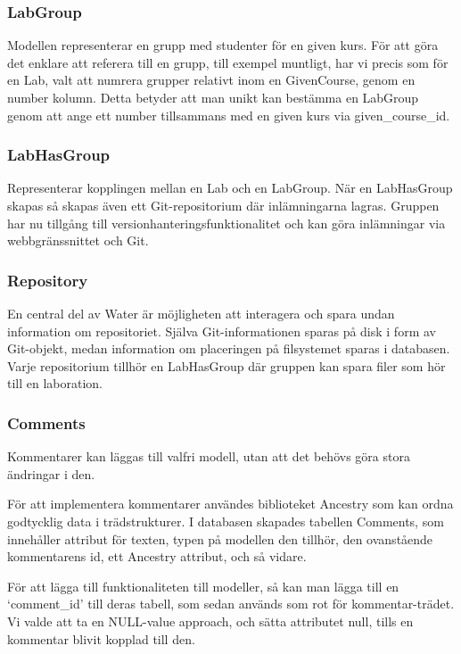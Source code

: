 \subsubsection{LabGroup}
Modellen representerar en grupp med studenter för en given kurs. För att göra det enklare att referera till en grupp, till exempel muntligt, har vi precis som för en Lab, valt att numrera grupper relativt inom en GivenCourse, genom en number kolumn. Detta betyder att man unikt kan bestämma en LabGroup genom att ange ett number tillsammans med en given kurs via given\_course\_id.

\subsubsection{LabHasGroup}\label{sec:modell-labhasgroup}
Representerar kopplingen mellan en Lab och en LabGroup. När en LabHasGroup skapas så skapas även ett Git-repositorium där inlämningarna lagras. Gruppen har nu tillgång till versionhanteringsfunktionalitet och kan göra inlämningar via webbgränssnittet och Git.

\subsubsection{Repository}
En central del av Water är möjligheten att interagera och spara undan information om repositoriet. Själva Git-informationen sparas på disk i form av Git-objekt, medan information om placeringen på filsystemet sparas i databasen. Varje repositorium tillhör en LabHasGroup där gruppen kan spara filer som hör till en laboration.

\subsubsection{Comments}
Kommentarer kan läggas till valfri modell, utan att det behövs göra stora ändringar i den. 

För att implementera kommentarer användes biblioteket Ancestry som kan ordna godtycklig data i trädstrukturer. I databasen skapades tabellen Comments, som innehåller attribut för texten, typen på modellen den tillhör, den ovanstående kommentarens id, ett Ancestry attribut, och så vidare. 

För att lägga till funktionaliteten till modeller, så kan man lägga till en ‘comment\_id’ till deras tabell, som sedan används som rot för kommentar-trädet. Vi valde att ta en NULL-value approach, och sätta attributet null, tills en kommentar blivit kopplad till den.
    
